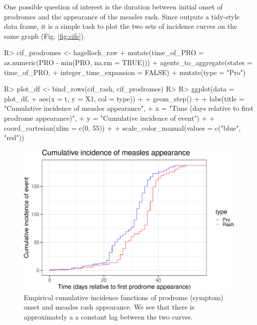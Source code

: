 \documentclass[
  shortnames]{jss}
\begin{document}
One possible question of interest is the duration between initial onset
of prodromes and the appearance of the measles rash. Since
 outputs a tidy-style data frame, it is a
simple task to plot the two sets of incidence curves on the same graph
(Fig. \ref{fig:cifs}).

\begin{CodeChunk}
\begin{CodeInput}
R> cif_prodromes <- hagelloch_raw %
+   mutate(time_of_PRO = as.numeric(PRO - min(PRO, na.rm = TRUE))) %
+   agents_to_aggregate(states = time_of_PRO,
+                       integer_time_expansion = FALSE) %
+   mutate(type = "Pro")
\end{CodeInput}
\end{CodeChunk}

\begin{CodeChunk}
\begin{CodeInput}
R> plot_df <- bind_rows(cif_rash, cif_prodromes)
R> 
R> ggplot(data = plot_df,
+        aes(x = t, y = X1, col = type)) + 
+   geom_step() + 
+   labs(title = "Cumulative incidence of measles appearance",
+        x = "Time (days relative to first prodrome appearance)",
+        y = "Cumulative incidence of event") + 
+   coord_cartesian(xlim = c(0, 55)) +
+   scale_color_manual(values = c("blue", "red"))
\end{CodeInput}
\begin{figure}[H]

{\centering \includegraphics{Figs/unnamed-chunk-7-1} 

}

\caption{\label{fig:cifs}Empirical cumulative incidence functions of prodrome (symptom) onset and measles rash appearance.  We see that there is approximately a a constant lag between the two curves.}\label{fig:unnamed-chunk-7}
\end{figure}
\end{CodeChunk}
\end{document}
